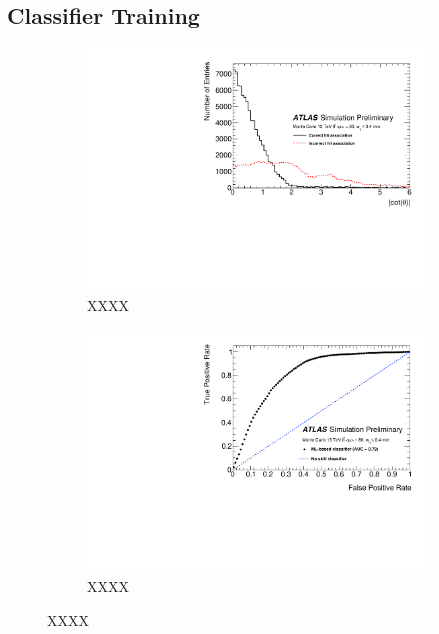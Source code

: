 \subsection{Classifier Training}


\begin{figure}[!htbp]
\centering
    \begin{subfigure}[a]{0.86\textwidth}
        \includegraphics[width=\linewidth]{images/4-ml-based-predictor/histo.pdf}
        \caption{XXXX}
    \end{subfigure}
    \hfill
    \begin{subfigure}[b]{0.86\textwidth}
        \centering
        \includegraphics[width=\linewidth]{images/4-ml-based-predictor/roc.pdf}
        \caption{XXXX}
    \end{subfigure}
\caption{XXXX}
\label{fig:1-dimensional-classifier-training}
\end{figure}



